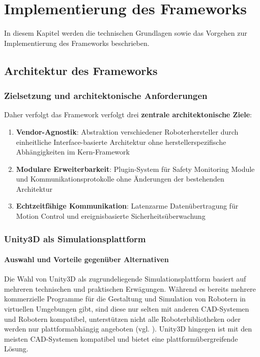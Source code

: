 \chapter{Implementierung des Frameworks}
\label{cap:framework}
In diesem Kapitel werden die technischen Grundlagen sowie das Vorgehen zur Implementierung des Frameworks beschrieben.

\section{Architektur des Frameworks}
\label{sec:architektur_frameowork}

\subsection{Zielsetzung und architektonische Anforderungen}

Daher verfolgt das Framework verfolgt drei \textbf{zentrale architektonische
	Ziele}:

\begin{enumerate}
	\item \textbf{Vendor-Agnostik}: Abstraktion verschiedener Roboterhersteller durch einheitliche Interface-basierte Architektur ohne herstellerspezifische Abhängigkeiten im Kern-Framework

	\item \textbf{Modulare Erweiterbarkeit}: Plugin-System für Safety Monitoring Module und Kommunikationsprotokolle ohne Änderungen der bestehenden Architektur

	\item \textbf{Echtzeitfähige Kommunikation}: Latenzarme Datenübertragung für Motion Control und ereignisbasierte Sicherheitsüberwachung
\end{enumerate}

\subsection{Unity3D als Simulationsplattform}

\subsubsection{Auswahl und Vorteile gegenüber Alternativen}

Die Wahl von Unity3D als zugrundeliegende Simulationsplattform basiert auf
mehreren technischen und praktischen Erwägungen. Während es bereits mehrere
kommerzielle Programme für die Gestaltung und Simulation von Robotern in
virtuellen Umgebungen gibt, sind diese nur selten mit anderen CAD-Systemen und
Robotern kompatibel, unterstützen nicht alle Roboterbibliotheken oder werden
nur plattformabhängig angeboten (vgl. ). Unity3D
hingegen ist mit den meisten CAD-Systemen kompatibel und bietet eine
plattformübergreifende Lösung.

